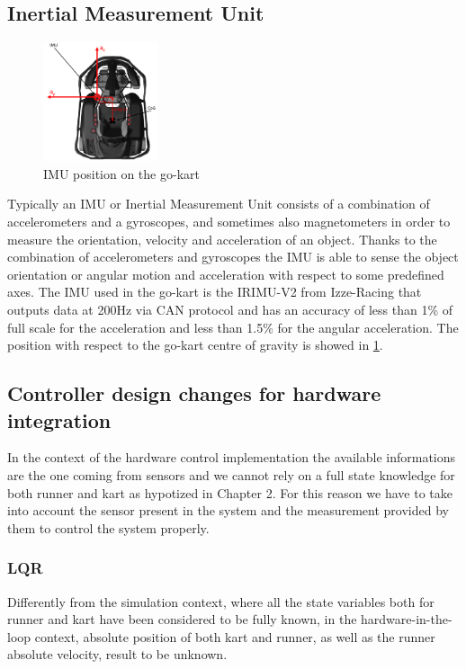 \documentclass[a4paper,12pt,oneside]{book}
\begin{document}
\subsection*{Inertial Measurement Unit}

\begin{figure}[h!]
	\centering
	\includegraphics[width=0.3\textwidth]{IMU.png}
\caption{IMU position on the go-kart}
\label{IMU_pose}
\end{figure}

Typically an IMU or Inertial Measurement Unit consists of a combination of accelerometers and a gyroscopes, and sometimes also magnetometers in order to measure the orientation, velocity and acceleration of an object.
Thanks to the combination of accelerometers and gyroscopes the IMU is able to sense the object orientation or angular motion and acceleration with respect to some predefined axes.
The IMU used in the go-kart is the IRIMU-V2 from Izze-Racing that outputs data at 200Hz via CAN protocol and has an accuracy of less than 1\% of full scale for the acceleration and less than 1.5\% for the angular acceleration.
The position with respect to the go-kart centre of gravity is showed in \ref{IMU_pose}.


\subsection{Controller design changes for hardware integration}
In the context of the hardware control implementation the available informations are the one coming from sensors and we cannot rely on a full state knowledge for both runner and kart as hypotized in Chapter 2.
For this reason we have to take into account the sensor present in the system and the measurement provided by them to control the system properly. 

\subsubsection*{LQR}
Differently from the simulation context, where all the state variables both for runner and kart have been considered to be fully known, in the hardware-in-the-loop context, absolute position of both kart and runner, as well as the runner absolute velocity, result to be unknown.
\end{document}

